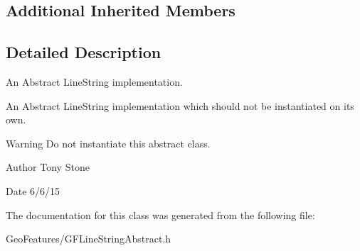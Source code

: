 \subsection*{Additional Inherited Members}


\subsection{Detailed Description}
An Abstract Line\+String implementation. 

An Abstract Line\+String implementation which should not be instantiated on it\textquotesingle{}s own.

\begin{DoxyWarning}{Warning}
Do not instantiate this abstract class.
\end{DoxyWarning}
\begin{DoxyAuthor}{Author}
Tony Stone 
\end{DoxyAuthor}
\begin{DoxyDate}{Date}
6/6/15 
\end{DoxyDate}


The documentation for this class was generated from the following file\+:\begin{DoxyCompactItemize}
\item 
Geo\+Features/G\+F\+Line\+String\+Abstract.\+h\end{DoxyCompactItemize}
